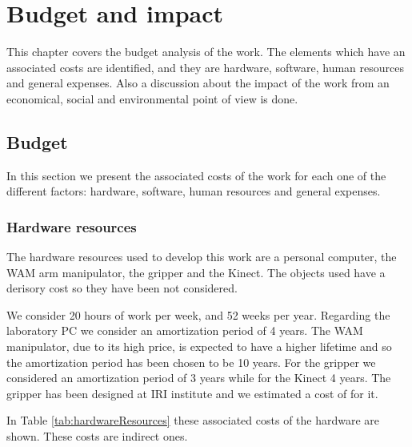 \chapter{Budget and impact}
\label{ch:budget}
This chapter covers the budget analysis of the work. The elements which have an associated costs are identified, and they are hardware, software, human resources and general expenses. Also a discussion about the impact of the work from an economical, social and environmental point of view is done. 

\section{Budget}
In this section we present the associated costs of the work for each one of the different factors: hardware, software, human resources and general expenses.

\subsection*{Hardware resources}
The hardware resources used to develop this work are a personal computer, the WAM arm manipulator, the gripper and the Kinect. The objects used have a derisory cost so they have been not considered. 

We consider 20 hours of work per week, and 52 weeks per year.
Regarding the laboratory PC we consider an amortization period of 4 years. The WAM manipulator, due to its high price, is expected to have a higher lifetime and so the amortization period has been chosen to be 10 years. For the gripper we considered an amortization period of 3 years while for the Kinect 4 years. The gripper has been designed at IRI institute and we estimated a cost of  for it.

In Table \ref{tab:hardwareResources} these associated costs of the hardware are shown. These costs are indirect ones.


